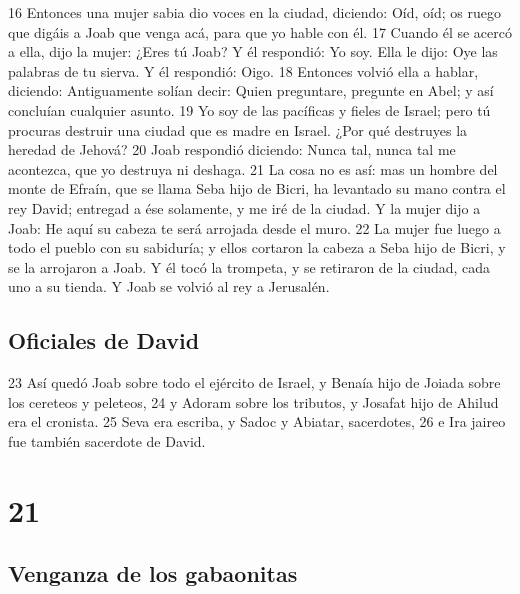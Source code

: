 16 Entonces una mujer sabia dio voces en la ciudad, diciendo: Oíd, oíd; os ruego que digáis a Joab que venga acá, para que yo hable con él.
17 Cuando él se acercó a ella, dijo la mujer: ¿Eres tú Joab? Y él respondió: Yo soy. Ella le dijo: Oye las palabras de tu sierva. Y él respondió: Oigo.
18 Entonces volvió ella a hablar, diciendo: Antiguamente solían decir: Quien preguntare, pregunte en Abel; y así concluían cualquier asunto.
19 Yo soy de las pacíficas y fieles de Israel; pero tú procuras destruir una ciudad que es madre en Israel. ¿Por qué destruyes la heredad de Jehová?
20 Joab respondió diciendo: Nunca tal, nunca tal me acontezca, que yo destruya ni deshaga.
21 La cosa no es así: mas un hombre del monte de Efraín, que se llama Seba hijo de Bicri, ha levantado su mano contra el rey David; entregad a ése solamente, y me iré de la ciudad. Y la mujer dijo a Joab: He aquí su cabeza te será arrojada desde el muro.
22 La mujer fue luego a todo el pueblo con su sabiduría; y ellos cortaron la cabeza a Seba hijo de Bicri, y se la arrojaron a Joab. Y él tocó la trompeta, y se retiraron de la ciudad, cada uno a su tienda. Y Joab se volvió al rey a Jerusalén.
\section*{Oficiales de David }

23 Así quedó Joab sobre todo el ejército de Israel, y Benaía hijo de Joiada sobre los cereteos y peleteos,
24 y Adoram sobre los tributos, y Josafat hijo de Ahilud era el cronista.
25 Seva era escriba, y Sadoc y Abiatar, sacerdotes,
26 e Ira jaireo fue también sacerdote de David.

\chapter{21}

\section*{Venganza de los gabaonitas}


